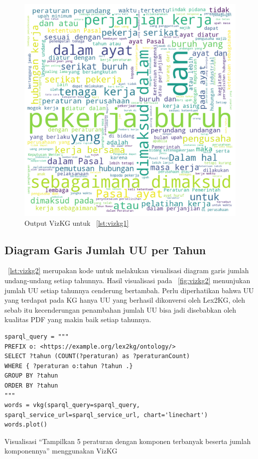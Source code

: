 \begin{figure}[H]
  \centering
  \includegraphics[scale=0.5]{pictures/vizkg1.png}
  \caption{Output VizKG untuk \lst~\ref{lst:vizkg1}}
  \label{fig:vizkg1}
\end{figure}

\subsection{Diagram Garis Jumlah UU per Tahun}
\label{subsec:diagram-garis}

\lst~\ref{lst:vizkg2} merupakan kode untuk melakukan visualisasi diagram garis jumlah undang-undang
setiap tahunnya. Hasil visualisasi pada \pic~\ref{fig:vizkg2} menunjukan jumlah UU setiap tahunnya
cenderung bertambah. Perlu diperhatikan bahwa UU yang terdapat pada KG hanya UU yang berhasil
dikonversi oleh Lex2KG, oleh sebab itu kecenderungan penambahan jumlah UU bisa jadi disebabkan oleh
kualitas PDF yang makin baik setiap tahunnya.

\begin{listing}[H]
  \begin{verbatim}
sparql_query = """
PREFIX o: <https://example.org/lex2kg/ontology/>
SELECT ?tahun (COUNT(?peraturan) as ?peraturanCount)
WHERE { ?peraturan o:tahun ?tahun .}
GROUP BY ?tahun
ORDER BY ?tahun
"""
words = vkg(sparql_query=sparql_query, sparql_service_url=sparql_service_url, chart='linechart')
words.plot()
  \end{verbatim}
  \caption{Visualisasi ``Tampilkan 5 peraturan dengan komponen terbanyak beserta jumlah komponennya'' menggunakan VizKG}
  \label{lst:vizkg2}
\end{listing}


